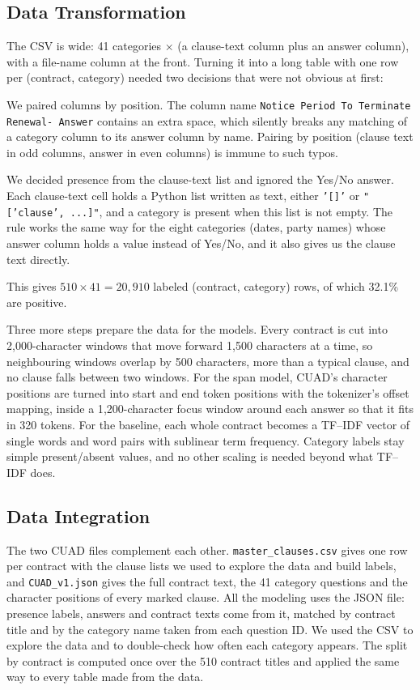 \subsection{Data Transformation}
\label{sec:datatransform}
The CSV is wide: 41 categories $\times$ (a clause-text column plus an answer column), with a file-name column at the front. Turning it into a long table with one row per (contract, category) needed two decisions that were not obvious at first:

We paired columns by position. The column name \texttt{Notice Period To Terminate Renewal- Answer} contains an extra space, which silently breaks any matching of a category column to its answer column by name. Pairing by position (clause text in odd columns, answer in even columns) is immune to such typos.

We decided presence from the clause-text list and ignored the Yes/No answer. Each clause-text cell holds a Python list written as text, either \texttt{'[]'} or \texttt{"['clause', ...]"}, and a category is present when this list is not empty. The rule works the same way for the eight categories (dates, party names) whose answer column holds a value instead of Yes/No, and it also gives us the clause text directly.

This gives $510 \times 41 = 20{,}910$ labeled (contract, category) rows, of which 32.1\% are positive.

Three more steps prepare the data for the models. Every contract is cut into 2{,}000-character windows that move forward 1{,}500 characters at a time, so neighbouring windows overlap by 500 characters, more than a typical clause, and no clause falls between two windows. For the span model, CUAD's character positions are turned into start and end token positions with the tokenizer's offset mapping, inside a 1{,}200-character focus window around each answer so that it fits in 320 tokens. For the baseline, each whole contract becomes a TF--IDF vector of single words and word pairs with sublinear term frequency. Category labels stay simple present/absent values, and no other scaling is needed beyond what TF--IDF does.

\subsection{Data Integration}
The two CUAD files complement each other. \texttt{master\_clauses.csv} gives one row per contract with the clause lists we used to explore the data and build labels, and \texttt{CUAD\_v1.json} gives the full contract text, the 41 category questions and the character positions of every marked clause. All the modeling uses the JSON file: presence labels, answers and contract texts come from it, matched by contract title and by the category name taken from each question ID. We used the CSV to explore the data and to double-check how often each category appears. The split by contract is computed once over the 510 contract titles and applied the same way to every table made from the data.

